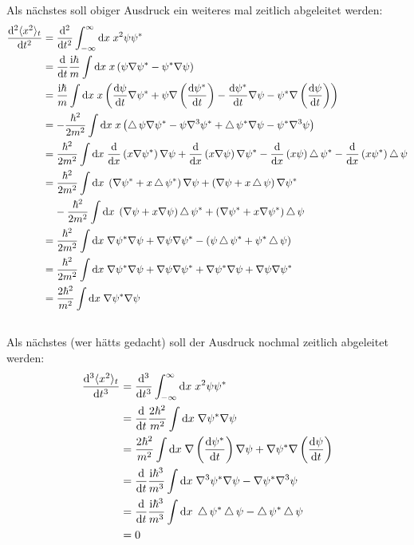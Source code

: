 \documentclass[11pt, ngerman, fleqn, DIV=15, headinclude]{scrartcl}
\newcommand\odx[3]{\frac{\dif^{#1} {#2}}{\dif {#3}^{#1}}}
\begin{document}
\subsection{}

Als nächstes soll obiger Ausdruck ein weiteres mal zeitlich abgeleitet werden:
\begin{align*}
	\odx{2}{\bracket{x^2}_t}{t}	&= \odx{2}{}{t}\int_{-\infty}^{\infty}\dif x\; x^2\psi\psi^*\\
								&= \od{}{t}\frac{\iup\hbar}{m}\int\dif x\; x\del{\psi\nabla\psi^*-\psi^*\nabla\psi}\\
								&= \frac{\iup\hbar}{m}\int\dif x\; x\del{\od{\psi}{t}\nabla\psi^*+\psi\nabla\del{\od{\psi^*}{t}}-\od{\psi^*}{t}\nabla\psi-\psi^*\nabla\del{\od{\psi}{t}}}\\
								&= -\frac{\hbar^2}{2m^2}\int\dif x\; x\del{\laplace\psi\nabla\psi^*-\psi\nabla^3\psi^*+\laplace\psi^*\nabla\psi-\psi^*\nabla^3\psi}\\
								&= \frac{\hbar^2}{2m^2}\int\dif x\; \od{}{x}\del{x\nabla\psi^*}\nabla\psi+\od{}{x}\del{x\nabla\psi}\nabla\psi^*-\od{}{x}\del{x\psi}\laplace\psi^*-\od{}{x}\del{x\psi^*}\laplace\psi\\
								&= \frac{\hbar^2}{2m^2}\int\dif x\; \del{\nabla\psi^*+x\laplace\psi^*}\nabla\psi+\del{\nabla\psi+x\laplace\psi}\nabla\psi^*\\
								&\;\;\;\;-\frac{\hbar^2}{2m^2}\int\dif x\;\del{\nabla\psi+x\nabla\psi}\laplace\psi^*+\del{\nabla\psi^*+x\nabla\psi^*}\laplace\psi\\
								&= \frac{\hbar^2}{2m^2}\int\dif x\; \nabla\psi^*\nabla\psi+\nabla\psi\nabla\psi^*-\del{\psi\laplace\psi^*+\psi^*\laplace\psi}\\
								&= \frac{\hbar^2}{2m^2}\int\dif x\; \nabla\psi^*\nabla\psi+\nabla\psi\nabla\psi^*+\nabla\psi^*\nabla\psi+\nabla\psi\nabla\psi^*\\
								&= \frac{2\hbar^2}{m^2}\int\dif x\; \nabla\psi^*\nabla\psi
\end{align*}

\subsection{}

Als nächstes (wer hätts gedacht) soll der Ausdruck nochmal zeitlich abgeleitet werden:
\begin{align*}
	\odx{3}{\bracket{x^2}_t}{t}	&= \odx{3}{}{t}\int_{-\infty}^{\infty}\dif x\; x^2\psi\psi^*\\
								&= \od{}{t}\frac{2\hbar^2}{m^2}\int\dif x\; \nabla\psi^*\nabla\psi\\
								&= \frac{2\hbar^2}{m^2}\int\dif x\; \nabla\del{\od{\psi^*}{t}}\nabla\psi+\nabla\psi^*\nabla\del{\od{\psi}{t}}\\
								&= \od{}{t}\frac{\iup\hbar^3}{m^3}\int\dif x\; \nabla^3\psi^*\nabla\psi-\nabla\psi^*\nabla^3\psi\\
								&= \od{}{t}\frac{\iup\hbar^3}{m^3}\int\dif x\; \laplace\psi^*\laplace\psi-\laplace\psi^*\laplace\psi\\
								&= 0
\end{align*}
\end{document}

